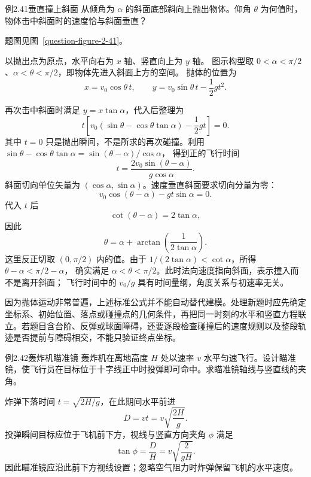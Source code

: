 \begin{origexamplebox}{例2.41\quad 垂直撞上斜面}
从倾角为 $\alpha$ 的斜面底部斜向上抛出物体。仰角 $\theta$ 为何值时，物体击中斜面时的速度恰与斜面垂直？
\par 题图见图~\ref{question-figure-2-41}。
\KQuestionBP
\end{origexamplebox}
\begin{xesolution}
以抛出点为原点，水平向右为 $x$ 轴、竖直向上为 $y$ 轴。
图示构型取 $0<\alpha<\pi/2$、$\alpha<\theta<\pi/2$，即物体先进入斜面上方的空间。
抛体的位置为
\[
 x=v_0\cos\theta\,t,\qquad y=v_0\sin\theta\,t-\frac12gt^2.
\]
\InclinedPlaneNormalImpactDiagram

再次击中斜面时满足 $y=x\tan\alpha$，代入后整理为
\[
 t\left[v_0(\sin\theta-\cos\theta\tan\alpha)-\frac12gt\right]=0.
\]
其中 $t=0$ 只是抛出瞬间，不是所求的再次碰撞。利用
$\sin\theta-\cos\theta\tan\alpha=\sin(\theta-\alpha)/\cos\alpha$，
得到正的飞行时间
\[
t=\frac{2v_0\sin(\theta-\alpha)}{g\cos\alpha}.
\]
斜面切向单位矢量为 $(\cos\alpha,\sin\alpha)$。速度垂直斜面要求切向分量为零：
\[
v_0\cos(\theta-\alpha)-gt\sin\alpha=0.
\]
代入 $t$ 后
\[
\cot(\theta-\alpha)=2\tan\alpha,
\]
因此
\[
 \boxed{\theta=\alpha+\arctan\!\left(\frac{1}{2\tan\alpha}\right)}.
\]
这里反正切取 $(0,\pi/2)$ 内的值。由于
$1/(2\tan\alpha)<\cot\alpha$，所得 $\theta-\alpha<\pi/2-\alpha$，
确实满足 $\alpha<\theta<\pi/2$。此时法向速度指向斜面，表示撞入而不是离开斜面；
飞行时间中的 $v_0/g$ 具有时间量纲，角度关系与初速率无关。
\end{xesolution}

因为抛体运动非常普遍，上述标准公式并不能自动替代建模。处理新题时应先确定坐标系、初始位置、落点或碰撞点的几何条件，再把同一时刻的水平和竖直方程联立。若题目含台阶、反弹或球面障碍，还要逐段检查碰撞后的速度规则以及整段轨迹是否提前与障碍相交，不能只验证终点坐标。

\ifdefined\Needspace{}\fi
\begin{origexamplebox}{例2.42\quad 轰炸机瞄准镜}
轰炸机在离地高度 $H$ 处以速率 $v$ 水平匀速飞行。设计瞄准镜，使飞行员在目标位于十字线正中时投弹即可命中。求瞄准镜轴线与竖直线的夹角。
\end{origexamplebox}
\begin{xesolution}
炸弹下落时间 $t=\sqrt{2H/g}$，在此期间水平前进
\[
D=vt=v\sqrt{\frac{2H}{g}}.
\]
投弹瞬间目标应位于飞机前下方，视线与竖直方向夹角 $\phi$ 满足
\[
 \boxed{\tan\phi=\frac DH=v\sqrt{\frac{2}{gH}}}.
\]
因此瞄准镜应沿此前下方视线设置；忽略空气阻力时炸弹保留飞机的水平速度。
\end{xesolution}

